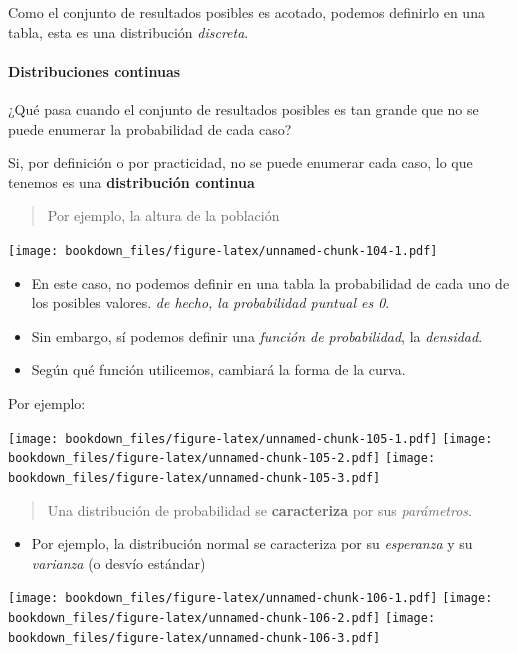 \documentclass[]{book}
\providecommand{\tightlist}{%
  \setlength{\itemsep}{0pt}\setlength{\parskip}{0pt}}
\let\oldparagraph\paragraph
\renewcommand{\paragraph}[1]{\oldparagraph{#1}\mbox{}}
\begin{document}
Como el conjunto de resultados posibles es acotado, podemos definirlo en una tabla, esta es una distribución \emph{discreta}.

\hypertarget{distribuciones-continuas}{%
\paragraph{Distribuciones continuas}\label{distribuciones-continuas}}

¿Qué pasa cuando el conjunto de resultados posibles es tan grande que no se puede enumerar la probabilidad de cada caso?

Si, por definición o por practicidad, no se puede enumerar cada caso, lo que tenemos es una \textbf{distribución continua}

\begin{quote}
Por ejemplo, la altura de la población
\end{quote}

\texttt{[image: bookdown\_files/figure-latex/unnamed-chunk-104-1.pdf]}

\begin{itemize}
\item
  En este caso, no podemos definir en una tabla la probabilidad de cada uno de los posibles valores. \emph{de hecho, la probabilidad puntual es 0}.
\item
  Sin embargo, sí podemos definir una \emph{función de probabilidad}, la \emph{densidad}.
\item
  Según qué función utilicemos, cambiará la forma de la curva.
\end{itemize}

Por ejemplo:

\texttt{[image: bookdown\_files/figure-latex/unnamed-chunk-105-1.pdf]} \texttt{[image: bookdown\_files/figure-latex/unnamed-chunk-105-2.pdf]} \texttt{[image: bookdown\_files/figure-latex/unnamed-chunk-105-3.pdf]}

\begin{quote}
Una distribución de probabilidad se \textbf{caracteriza} por sus \emph{parámetros}.
\end{quote}

\begin{itemize}
\tightlist
\item
  Por ejemplo, la distribución normal se caracteriza por su \emph{esperanza} y su \emph{varianza} (o desvío estándar)
\end{itemize}

\texttt{[image: bookdown\_files/figure-latex/unnamed-chunk-106-1.pdf]} \texttt{[image: bookdown\_files/figure-latex/unnamed-chunk-106-2.pdf]} \texttt{[image: bookdown\_files/figure-latex/unnamed-chunk-106-3.pdf]}
\end{document}
